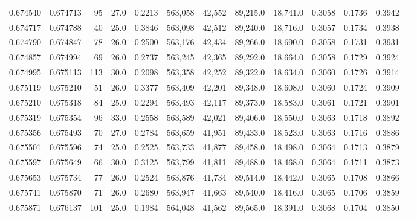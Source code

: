 \begin{tabular}{rrrrrrrrrrrrr}
0.674540 & 0.674713 &    95 & 27.0 &                                     0.2213 & 563,058 &  42,552 &  89,215.0 &  18,741.0 & 0.3058 & 0.1736 & 0.3942 \\
0.674717 & 0.674788 &    40 & 25.0 &                                     0.3846 & 563,098 &  42,512 &  89,240.0 &  18,716.0 & 0.3057 & 0.1734 & 0.3938 \\
0.674790 & 0.674847 &    78 & 26.0 &                                     0.2500 & 563,176 &  42,434 &  89,266.0 &  18,690.0 & 0.3058 & 0.1731 & 0.3931 \\
0.674857 & 0.674994 &    69 & 26.0 &                                     0.2737 & 563,245 &  42,365 &  89,292.0 &  18,664.0 & 0.3058 & 0.1729 & 0.3924 \\
0.674995 & 0.675113 &   113 & 30.0 &                                     0.2098 & 563,358 &  42,252 &  89,322.0 &  18,634.0 & 0.3060 & 0.1726 & 0.3914 \\
0.675119 & 0.675210 &    51 & 26.0 &                                     0.3377 & 563,409 &  42,201 &  89,348.0 &  18,608.0 & 0.3060 & 0.1724 & 0.3909 \\
0.675210 & 0.675318 &    84 & 25.0 &                                     0.2294 & 563,493 &  42,117 &  89,373.0 &  18,583.0 & 0.3061 & 0.1721 & 0.3901 \\
0.675319 & 0.675354 &    96 & 33.0 &                                     0.2558 & 563,589 &  42,021 &  89,406.0 &  18,550.0 & 0.3063 & 0.1718 & 0.3892 \\
0.675356 & 0.675493 &    70 & 27.0 &                                     0.2784 & 563,659 &  41,951 &  89,433.0 &  18,523.0 & 0.3063 & 0.1716 & 0.3886 \\
0.675501 & 0.675596 &    74 & 25.0 &                                     0.2525 & 563,733 &  41,877 &  89,458.0 &  18,498.0 & 0.3064 & 0.1713 & 0.3879 \\
0.675597 & 0.675649 &    66 & 30.0 &                                     0.3125 & 563,799 &  41,811 &  89,488.0 &  18,468.0 & 0.3064 & 0.1711 & 0.3873 \\
0.675653 & 0.675734 &    77 & 26.0 &                                     0.2524 & 563,876 &  41,734 &  89,514.0 &  18,442.0 & 0.3065 & 0.1708 & 0.3866 \\
0.675741 & 0.675870 &    71 & 26.0 &                                     0.2680 & 563,947 &  41,663 &  89,540.0 &  18,416.0 & 0.3065 & 0.1706 & 0.3859 \\
0.675871 & 0.676137 &   101 & 25.0 &                                     0.1984 & 564,048 &  41,562 &  89,565.0 &  18,391.0 & 0.3068 & 0.1704 & 0.3850 \\

\end{tabular}
